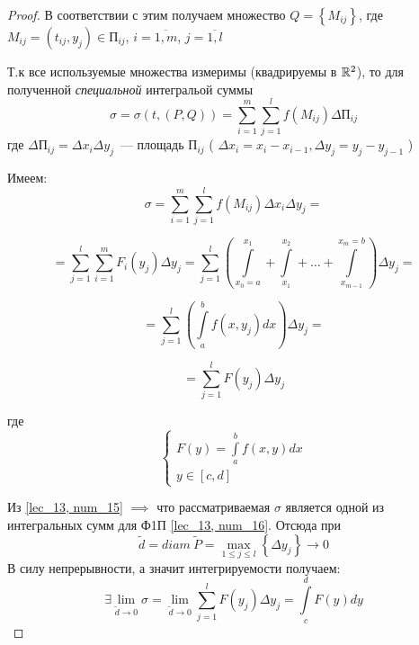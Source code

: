 \documentclass[../../main.tex]{subfiles}
\begin{document}
\begin{proof}
 	В соответствии с этим получаем множество 
 	$ Q = \left\lbrace M_{ij} \right\rbrace $,
 	где $ M_{ij} = \left( t_{ij}, y_j \right) \in \text{П}_{ij} $, 
 	$ i = \overline{1, m} $, 
 	$ j = \overline{1, l} $
 	
 	Т.к все используемые множества измеримы (квадрируемы в $ \mathbb{R}^2 $), 
 	то для полученной \emph{специальной} интегральой суммы
 	\begin{equation}
 	\label{lec_13, num_14}
 	\sigma = \sigma \left( t, \left( P, Q \right) \right) = 
 	\sum\limits_{i = 1}^m 
 	\sum\limits_{j = 1}^l f \left( M_{ij} \right) \Delta \text{П}_{ij}
 	\end{equation}
 	где $\Delta \text{П}_{ij} = \Delta x_i \Delta y_j$~---  
 	площадь $\text{П}_{ij}$ 
 	( $ \Delta x_i = x_i - x_{i-1}, \Delta y_j = y_j - y_{j - 1} $ )
 	
 	Имеем:
 	\[ \sigma = \sum\limits_{i = 1}^m 
 	\sum\limits_{j = 1}^l f \left( M_{ij} \right) \Delta x_i \Delta y_j = \]
 	
 	\[ = \sum\limits_{j = 1}^l 
 	\sum\limits_{i = 1}^m F_i \left( y_j \right) \Delta y_j = 
 	\sum\limits_{j = 1}^l \left( 
 	\int\limits_{x_0 = a}^{ x_1 } + \int\limits_{x_1}^{ x_2 } + \dots + 
 	\int\limits_{ x_{m-1} }^{x_m = b} \right) \Delta y_j = \]
 	
 	\[ = \sum\limits_{j = 1}^l \left( \int\limits_a^b f 
 	\left( x, y_j\right) dx \right) \Delta y_j =  \]
 	
 	\begin{equation}
 	\label{lec_13, num_15}
 	= \sum\limits_{j = 1}^l F \left( y_j \right) \Delta y_j 
 	\end{equation}
 	
 	где
 	\begin{equation}
 	\label{lec_13, num_16}
 	\begin{cases}
 	F \left( y \right) = \int\limits_a^b f \left( x, y \right) dx \\
 	y \in \left[ c, d \right] 
 	\end{cases}
 	\end{equation}
 	
 	Из \eqref{lec_13, num_15} $ \implies $ что рассматриваемая $\sigma$
 	является одной из интегральных сумм для Ф1П  \eqref{lec_13, num_16}.
 	Отсюда при 
 	\[ \widetilde{d} = diam\ \widetilde{P} = 
 		\underset{1 \leq j \leq l} {\max} \left\lbrace \Delta y_j \right\rbrace 
 	\longrightarrow 0 \]
 	В силу непрерывности, а значит интегрируемости получаем: 
 	\[ \exists \lim\limits_{ \widetilde{d} \to 0 } \sigma = 
 	\lim\limits_{ \widetilde{d} \to 0 } 
 	\sum\limits_{j = 1}^l F \left( y_j \right) \Delta y_j =
 	\int\limits_c^d F \left( y \right)dy  \]
 	

\end{proof}
\end{document}
